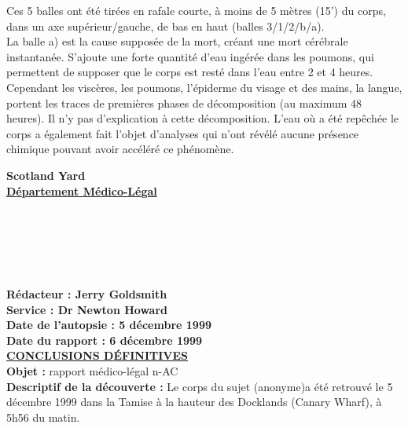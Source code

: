 \documentclass[11pt,twoside,a4paper]{book}
\begin{document}
Ces 5 balles ont {\'e}t{\'e} tir{\'e}es en rafale courte, {\`a} moins de 5 m{\`e}tres (15') du corps, dans un axe sup{\'e}rieur/gauche, de bas en haut (balles 3/1/2/b/a).~\\

La balle a) est la cause suppos{\'e}e de la mort, cr{\'e}ant une mort c{\'e}r{\'e}brale instantan{\'e}e. S'ajoute une forte quantit{\'e} d'eau ing{\'e}r{\'e}e dans les poumons, qui permettent de supposer que le corps est rest{\'e} dans l'eau entre 2 et 4 heures.~\\

Cependant les visc{\`e}res, les poumons, l'{\'e}piderme du visage et des mains, la langue, portent les traces de premi{\`e}res phases de d{\'e}composition (au maximum 48 heures). Il n'y pas d'explication {\`a} cette d{\'e}composition. L'eau o{\`u} a {\'e}t{\'e} rep{\^e}ch{\'e}e le corps a {\'e}galement fait l'objet d'analyses qui n'ont r{\'e}v{\'e}l{\'e} aucune pr{\'e}sence chimique pouvant avoir acc{\'e}l{\'e}r{\'e} ce ph{\'e}nom{\`e}ne.~\\

\clearpage

\begin{center}
\textbf{\Huge Scotland Yard}~\\
\textbf{\large \underline{D{\'e}partement M{\'e}dico-L{\'e}gal}}~\\
\end{center}

~\\~\\~\\~\\~\\

\textbf{R{\'e}dacteur : Jerry Goldsmith}~\\
\textbf{Service : Dr Newton Howard}~\\
\textbf{Date de l'autopsie : 5 d{\'e}cembre 1999}~\\
\textbf{Date du rapport : 6 d{\'e}cembre 1999}~\\

\textbf{\underline{\textsc{CONCLUSIONS D{\'E}FINITIVES}}}~\\

\textbf{Objet : }rapport m{\'e}dico-l{\'e}gal n-AC~\\

\textbf{Descriptif de la d{\'e}couverte : }Le corps du sujet (anonyme)a {\'e}t{\'e} retrouv{\'e} le 5 d{\'e}cembre 1999 dans la Tamise {\`a} la hauteur des Docklands (Canary Wharf), {\`a} 5h56 du matin. ~\\
\end{document}
